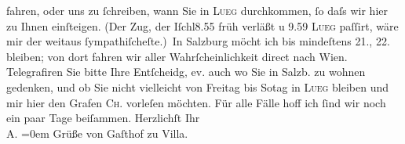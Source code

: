 \begin{ledgroupsized}[t]{13cm}
               fahren, oder uns zu ſchreiben, wann Sie in \textsc{Lueg} durchkommen, ſo daſs wir hier zu Ihnen einſteigen. (Der Zug, der Iſchl8.55 früh verläßt u 9.59{ }\textsc{Lueg} paſſirt, wäre mir der weitaus ſympathiſcheſte.) In Salzburg möcht ich bis mindeſtens 21., 22.
               bleiben; von dort fahren wir aller Wahrſcheinlichkeit direct nach Wien.\pend
           \pstart
           Telegrafiren Sie bitte Ihre Entſcheidg, ev. auch wo Sie in Salzb. zu {\pb}wohnen gedenken, und ob Sie nicht
               vielleicht von Freitag bis So{\geminationn}tag in \textsc{Lueg} bleiben und mir hier den Grafen \textsc{Ch}. vorleſen möchten.\pend
           \pstart
           Für alle Fälle hoff ich ſind wir noch ein paar Tage beiſammen.\pend
           \pstart
           Herzlichſt Ihr{\\[\baselineskip]}\spacefill\mbox{A.}\pend
           \leftskip=0em{}\pstart
           \noindent{}Grüße von Gaſthof zu Villa.\pend
           
         
         \endnumbering{}\end{ledgroupsized}  \newcommand{\dateiname}{L01444}\newcommand{\titel}{Arthur Schnitzler an Richard Beer-Hofmann, 14. 9. 1904}\newcommand{\editorInnen}{Martin Anton Müller und Gerd-Hermann Susen}
      